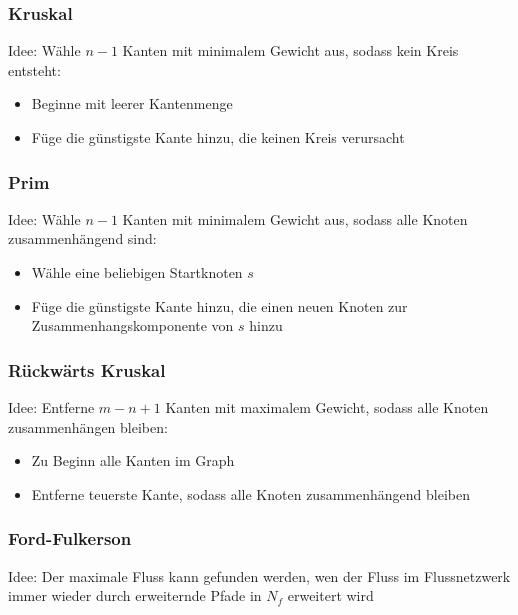 	\subsubsection{Kruskal}
	Idee: Wähle $n-1$ Kanten mit minimalem Gewicht aus, sodass kein Kreis entsteht:
	\begin{itemize}
	  \item Beginne mit leerer Kantenmenge
	  \item Füge die günstigste Kante hinzu, die keinen Kreis verursacht
	\end{itemize}
	\subsubsection{Prim}
	Idee: Wähle $n-1$ Kanten mit minimalem Gewicht aus, sodass alle Knoten zusammenhängend sind:
	\begin{itemize}
	  \item Wähle eine beliebigen Startknoten $s$
	  \item Füge die günstigste Kante hinzu, die einen neuen Knoten zur Zusammenhangskomponente von $s$ hinzu
	\end{itemize}
	\subsubsection{Rückwärts Kruskal}
	Idee: Entferne $m-n+1$ Kanten mit maximalem Gewicht, sodass alle Knoten zusammenhängen bleiben:
	\begin{itemize}
	  \item Zu Beginn alle Kanten im Graph
	  \item Entferne teuerste Kante, sodass alle Knoten zusammenhängend bleiben
	\end{itemize}
	\subsubsection{Ford-Fulkerson}
	Idee: Der maximale Fluss kann gefunden werden, wen der Fluss im Flussnetzwerk immer wieder durch erweiternde Pfade in $N_f$ erweitert wird

